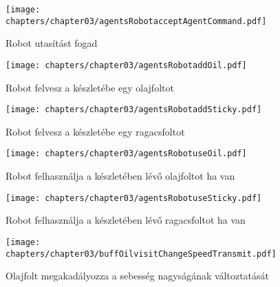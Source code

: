 \begin{figure}[h]
	\begin{center}
		\texttt{[image: chapters/chapter03/agentsRobotacceptAgentCommand.pdf]}
		\caption{Robot utasítást fogad}
		\label{fig:agents.Robot.accept}
	\end{center}
\end{figure}

\begin{figure}[h]
	\begin{center}
		\texttt{[image: chapters/chapter03/agentsRobotaddOil.pdf]}
		\caption{Robot felvesz a készletébe egy olajfoltot}
		\label{fig:agents.Robot.addOil}
	\end{center}
\end{figure}

\begin{figure}[h]
	\begin{center}
		\texttt{[image: chapters/chapter03/agentsRobotaddSticky.pdf]}
		\caption{Robot felvesz a készletébe egy ragacsfoltot}
		\label{fig:agents.Robot.addSticky}
	\end{center}
\end{figure}

\begin{figure}[h]
	\begin{center}
		\texttt{[image: chapters/chapter03/agentsRobotuseOil.pdf]}
		\caption{Robot felhasználja a készletében lévő olajfoltot ha van}
		\label{fig:agents.Robot.useOil}
	\end{center}
\end{figure}

\begin{figure}[h]
	\begin{center}
		\texttt{[image: chapters/chapter03/agentsRobotuseSticky.pdf]}
		\caption{Robot felhasználja a készletében lévő ragacsfoltot ha van}
		\label{fig:agents.Robot.useSticky}
	\end{center}
\end{figure}

\begin{figure}[h]
	\begin{center}
		\texttt{[image: chapters/chapter03/buffOilvisitChangeSpeedTransmit.pdf]}
		\caption{Olajfolt megakadályozza a sebesség nagyságának változtatását}
		\label{fig:buff.Oil.visit}
	\end{center}
\end{figure}

